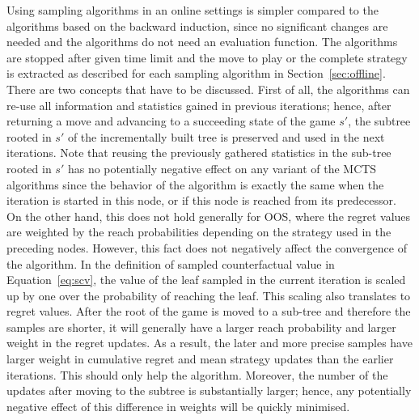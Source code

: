 
Using sampling algorithms in an online settings is simpler compared to the algorithms based on the backward induction, since no significant changes are needed and the algorithms do not need an evaluation function.
The algorithms are stopped after given time limit and the move to play or the complete strategy is extracted as described for each sampling algorithm in Section~\ref{sec:offline}.
There are two concepts that have to be discussed.
First of all, the algorithms can re-use all information and statistics gained in previous iterations; hence, after returning a move and advancing to a succeeding state of the game $s'$, the subtree rooted in $s'$ of the incrementally built tree is preserved and used in the next iterations.
Note that reusing the previously gathered statistics in the sub-tree rooted in $s'$ has no potentially negative effect on any variant of the MCTS algorithms since the behavior of the algorithm is exactly the same when the iteration is started in this node, or if this node is reached from its predecessor. On the other hand, this does not hold generally for OOS, where the regret values are weighted by the reach probabilities depending on the strategy used in the preceding nodes.  However, this fact does not negatively affect the convergence of the algorithm. In the definition of sampled counterfactual value in Equation~\ref{eq:scv}, the value of the leaf sampled in the current iteration is scaled up by one over the probability of reaching the leaf. This scaling also translates to regret values. After the root of the game is moved to a sub-tree and therefore the samples are shorter, it will generally have a larger reach probability and larger weight in the regret updates. As a result, the later and more precise samples have larger weight in cumulative regret and mean strategy updates than the earlier iterations. This should only help the algorithm. Moreover, the number of the updates after moving to the subtree is substantially larger; hence, any potentially negative effect of this difference in weights will be quickly minimised.


